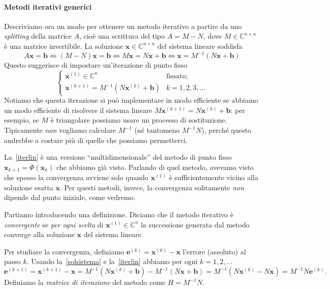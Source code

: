 \documentclass[a4paper]{report}
\theoremstyle{definiton}
\theoremstyle{remark}
\newcommand{\x}{\mathbf{x}}
\newcommand{\e}{\mathbf{e}}
\renewcommand{\b}{\mathbf{b}}
\begin{document}
\paragraph{Metodi iterativi generici}

Descriviamo ora un modo per ottenere un metodo iterativo a partire da uno \emph{splitting} della matrice $A$, cioè una scrittura del tipo $A = M - N$, dove $M\in\mathbb{C}^{n\times n}$ è una matrice invertibile. La soluzione $\x\in\mathbb{C}^{n\times n}$ del sistema lineare soddisfa
\begin{equation} \label{solsistema}
    A\x = \b \iff (M-N)\x=\b \iff M\x = N\x + \b \iff \x = M^{-1}(N\x + \b)
\end{equation}
Questo suggerisce di impostare un'iterazione di punto fisso
\begin{equation} \label{iterlin}
    \begin{cases}
    \x^{(1)} \in \mathbb{C}^n & \text{fissato};\\
    \x^{(k+1)} = M^{-1}(N\x^{(k)} + \mathbf{b}) & k=1,2,3,\dots
    \end{cases}
\end{equation}
Notiamo che questa iterazione si può implementare in modo efficiente se abbiamo un modo efficiente di risolvere il sistema lineare $M\x^{(k+1)} = N\x^{(k)} + \b$: per esempio, se $M$ è triangolare possiamo usare un processo di sostituzione. Tipicamente \emph{non} vogliamo calcolare $M^{-1}$ (né tantomeno $M^{-1}N$), perché questo andrebbe a costare più di quello che possiamo permetterci.

La~\eqref{iterlin} è una versione ``multidimensionale'' del metodo di punto fisso $\x_{k+1} = \Phi(\x_k)$ che abbiamo già visto. Parlando di quel metodo, avevamo visto che spesso la convergenza avviene solo quando $\x^{(1)}$ è sufficientemente vicino alla soluzione esatta $\x$. Per questi metodi, invece, la convergenza solitamente \emph{non} dipende dal punto iniziale, come vedremo.

Partiamo introducendo una definizione. Diciamo che il metodo iterativo è \emph{convergente} se \emph{per ogni scelta} di $\x^{(1)}\in\mathbb{C}^n$ la successione generata dal metodo converge alla soluzione $\x$ del sistema lineare.

Per studiare la convergenza, definiamo $\e^{(k)} = \x^{(k)} - \x$ l'errore (assoluto) al passo $k$. Usando la~\eqref{solsistema} e la~\eqref{iterlin} abbiamo per ogni $k=1,2,\dots$
\begin{equation} \label{ekiter}
    \e^{(k+1)} = \x^{(k+1)} - \x = M^{-1}(N\x^{(k)} + \b) - M^{-1}(N\x + \b) = M^{-1}(N\x^{(k)}-N \x) = M^{-1}N \e^{(k)}.    
\end{equation}
Definiamo la \emph{matrice di iterazione} del metodo come $H = M^{-1}N$.
\end{document}
